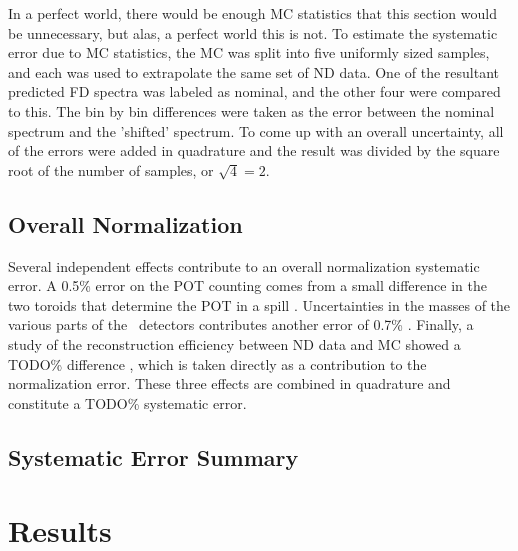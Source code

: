 In a perfect world, there would be enough MC statistics that this section would be unnecessary, but alas, a perfect world this is not. To estimate the systematic error due to MC statistics, the MC was split into five uniformly sized samples, and each was used to extrapolate the same set of ND data. One of the resultant predicted FD spectra was labeled as nominal, and the other four were compared to this. The bin by bin differences were taken as the error between the nominal spectrum and the 'shifted' spectrum. To come up with an overall uncertainty, all of the errors were added in quadrature and the result was divided by the square root of the number of samples, or $\sqrt{4} = 2$.

\subsection{Overall Normalization}

Several independent effects contribute to an overall normalization systematic error. A 0.5\% error on the POT counting comes from a small difference in the two toroids that determine the POT in a spill \cite{ref:TNBeam}. Uncertainties in the masses of the various parts of the \nova~detectors contributes another error of 0.7\% \cite{ref:MassError}. Finally, a study of the reconstruction efficiency between ND data and MC showed a TODO\% difference \cite{ref:NDDataMCRecoEff}, which is taken directly as a contribution to the normalization error. These three effects are combined in quadrature and constitute a TODO\% systematic error.

\subsection{Systematic Error Summary}

\section{Results}